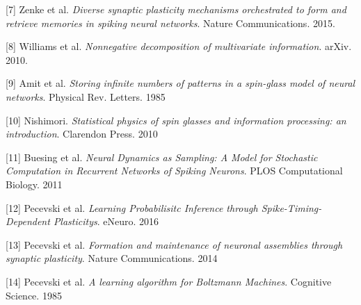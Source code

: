 \documentclass{ucetd}
\begin{document}
[7] Zenke et al. \textit{Diverse synaptic plasticity mechanisms
orchestrated to form and retrieve memories
in spiking neural networks}. Nature Communications. 2015.

[8] Williams et al. \textit{Nonnegative decomposition of multivariate information}. arXiv. 2010.

[9] Amit et al. \textit{Storing infinite numbers of patterns in a spin-glass model of neural networks}. Physical Rev. Letters. 1985

[10] Nishimori. \textit{Statistical physics of spin glasses and information processing: an introduction}. Clarendon Press. 2010

[11] Buesing et al. \textit{Neural Dynamics as Sampling: A Model for Stochastic Computation in Recurrent Networks of Spiking Neurons}. PLOS Computational Biology. 2011

[12] Pecevski et al. \textit{Learning Probabilisitc Inference through Spike-Timing-Dependent Plasticitys}. eNeuro. 2016

[13] Pecevski et al. \textit{Formation and maintenance of neuronal assemblies through synaptic plasticity}. Nature Communications. 2014

[14] Pecevski et al. \textit{A learning algorithm for Boltzmann Machines}. Cognitive Science. 1985

%
%
\end{document}
